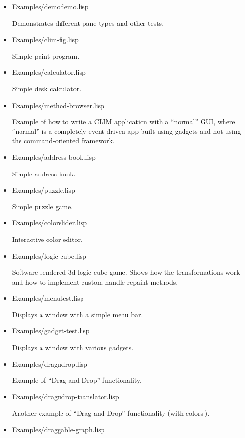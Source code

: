 \begin{itemize}
\item Examples/demodemo.lisp

  Demonstrates different pane types and other tests.

\item Examples/clim-fig.lisp

  Simple paint program.

\item Examples/calculator.lisp

  Simple desk calculator.

\item Examples/method-browser.lisp

  Example of how to write a CLIM application with a ``normal'' GUI,
  where ``normal'' is a completely event driven app built using
  gadgets and not using the command-oriented framework.

\item Examples/address-book.lisp

  Simple address book.

\item Examples/puzzle.lisp

  Simple puzzle game.

\item Examples/colorslider.lisp

  Interactive color editor.

\item Examples/logic-cube.lisp

  Software-rendered 3d logic cube game. Shows how the transformations
  work and how to implement custom handle-repaint methods.

\item Examples/menutest.lisp

  Displays a window with a simple menu bar.

\item Examples/gadget-test.lisp

  Displays a window with various gadgets.

\item Examples/dragndrop.lisp

  Example of ``Drag and Drop'' functionality.

\item Examples/dragndrop-translator.lisp

  Another example of ``Drag and Drop'' functionality (with colors!).

\item Examples/draggable-graph.lisp


\end{itemize}
